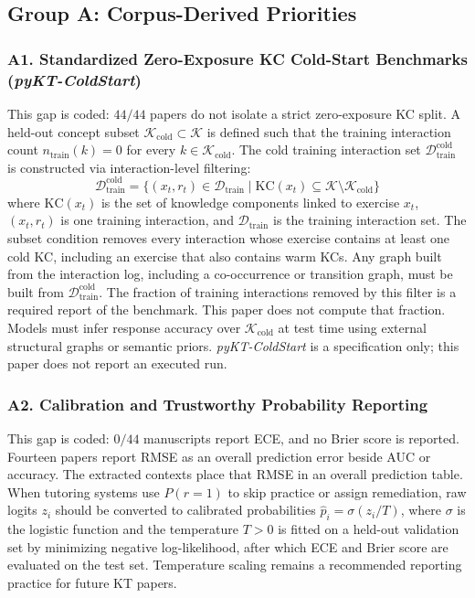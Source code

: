 \documentclass[lettersize,journal]{IEEEtran}
\begin{document}
\subsection{Group A: Corpus-Derived Priorities}

\subsubsection{A1. Standardized Zero-Exposure KC Cold-Start Benchmarks (\emph{pyKT-ColdStart})}
This gap is coded: $44/44$ papers do not isolate a strict zero-exposure KC split. A held-out concept subset $\mathcal{K}_{\text{cold}} \subset \mathcal{K}$ is defined such that the training interaction count $n_{\text{train}}(k) = 0$ for every $k \in \mathcal{K}_{\text{cold}}$. The cold training interaction set $\mathcal{D}_{\text{train}}^{\text{cold}}$ is constructed via interaction-level filtering:
\begin{equation}
\mathcal{D}_{\text{train}}^{\text{cold}} = \{(x_t, r_t) \in \mathcal{D}_{\text{train}} \mid \text{KC}(x_t) \subseteq \mathcal{K} \setminus \mathcal{K}_{\mathrm{cold}}\}
\end{equation}
where $\text{KC}(x_t)$ is the set of knowledge components linked to exercise $x_t$, $(x_t, r_t)$ is one training interaction, and $\mathcal{D}_{\text{train}}$ is the training interaction set. The subset condition removes every interaction whose exercise contains at least one cold KC, including an exercise that also contains warm KCs. Any graph built from the interaction log, including a co-occurrence or transition graph, must be built from $\mathcal{D}_{\text{train}}^{\text{cold}}$. The fraction of training interactions removed by this filter is a required report of the benchmark. This paper does not compute that fraction. Models must infer response accuracy over $\mathcal{K}_{\text{cold}}$ at test time using external structural graphs or semantic priors. \emph{pyKT-ColdStart} is a specification only; this paper does not report an executed run.

\subsubsection{A2. Calibration and Trustworthy Probability Reporting}
This gap is coded: $0/44$ manuscripts report ECE, and no Brier score is reported. Fourteen papers report RMSE as an overall prediction error beside AUC or accuracy. The extracted contexts place that RMSE in an overall prediction table. When tutoring systems use $P(r=1)$ to skip practice or assign remediation, raw logits $z_i$ should be converted to calibrated probabilities $\hat{p}_i = \sigma(z_i/T)$, where $\sigma$ is the logistic function and the temperature $T>0$ is fitted on a held-out validation set by minimizing negative log-likelihood, after which ECE and Brier score are evaluated on the test set. Temperature scaling remains a recommended reporting practice for future KT papers.
\end{document}
